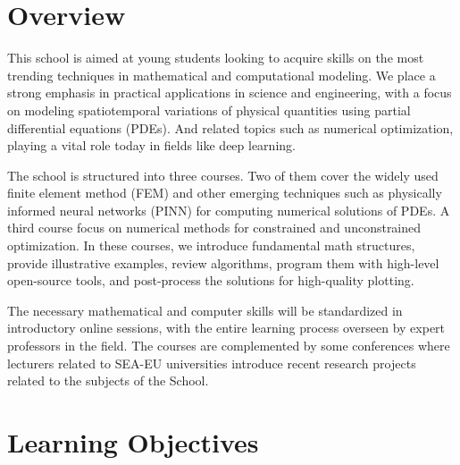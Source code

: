 \documentclass[letterpaper]{inzane_syllabus} %
\begin{document}

\makeprofile %

\section{Overview}

This school is aimed at young students looking to acquire skills on the most trending techniques in mathematical and computational modeling. We place a strong emphasis in practical applications in science and engineering, with a focus on modeling spatiotemporal variations of physical quantities using partial differential equations (PDEs). And related topics such as numerical optimization, playing a vital role today in fields like deep learning.

The school is structured into three courses. 
Two of them cover the widely used finite element method (FEM) and other emerging techniques such as physically informed neural networks (PINN) for computing numerical solutions of PDEs.
A third course focus on numerical methods for constrained and unconstrained optimization. 
In these courses, we introduce fundamental math structures, provide illustrative examples, review algorithms, program them with high-level open-source tools, and post-process the solutions for high-quality plotting.

The necessary mathematical and computer skills will be standardized in introductory online sessions, with the entire learning process overseen by expert professors in the field.
The courses are complemented by some conferences where lecturers related to SEA-EU universities  introduce recent research projects related to the subjects of the School.



\vspace{0.5cm}
\section{Learning Objectives}
\end{document}
